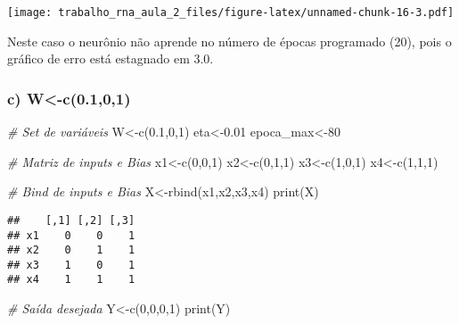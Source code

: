\documentclass[
]{article}
\newenvironment{Shaded}{\begin{snugshade}}{\end{snugshade}}
\newcommand{\CommentTok}[1]{\textcolor[rgb]{0.56,0.35,0.01}{\textit{#1}}}
\newcommand{\DecValTok}[1]{\textcolor[rgb]{0.00,0.00,0.81}{#1}}
\newcommand{\FloatTok}[1]{\textcolor[rgb]{0.00,0.00,0.81}{#1}}
\newcommand{\FunctionTok}[1]{\textcolor[rgb]{0.00,0.00,0.00}{#1}}
\newcommand{\NormalTok}[1]{#1}
\newcommand{\OtherTok}[1]{\textcolor[rgb]{0.56,0.35,0.01}{#1}}
\begin{document}
\texttt{[image: trabalho\_rna\_aula\_2\_files/figure-latex/unnamed-chunk-16-3.pdf]}

Neste caso o neurônio não aprende no número de épocas programado (20),
pois o gráfico de erro está estagnado em 3.0.

\hypertarget{c-w-c0.101}{%
\subsubsection{c) W\textless-c(0.1,0,1)}\label{c-w-c0.101}}

\begin{Shaded}
\begin{Highlighting}[]
\CommentTok{\# Set de variáveis}
\NormalTok{W}\OtherTok{\textless{}{-}}\FunctionTok{c}\NormalTok{(}\FloatTok{0.1}\NormalTok{,}\DecValTok{0}\NormalTok{,}\DecValTok{1}\NormalTok{)}
\NormalTok{eta}\OtherTok{\textless{}{-}}\FloatTok{0.01}
\NormalTok{epoca\_max}\OtherTok{\textless{}{-}}\DecValTok{80}

\CommentTok{\# Matriz de inputs e Bias}
\NormalTok{x1}\OtherTok{\textless{}{-}}\FunctionTok{c}\NormalTok{(}\DecValTok{0}\NormalTok{,}\DecValTok{0}\NormalTok{,}\DecValTok{1}\NormalTok{)}
\NormalTok{x2}\OtherTok{\textless{}{-}}\FunctionTok{c}\NormalTok{(}\DecValTok{0}\NormalTok{,}\DecValTok{1}\NormalTok{,}\DecValTok{1}\NormalTok{)}
\NormalTok{x3}\OtherTok{\textless{}{-}}\FunctionTok{c}\NormalTok{(}\DecValTok{1}\NormalTok{,}\DecValTok{0}\NormalTok{,}\DecValTok{1}\NormalTok{)}
\NormalTok{x4}\OtherTok{\textless{}{-}}\FunctionTok{c}\NormalTok{(}\DecValTok{1}\NormalTok{,}\DecValTok{1}\NormalTok{,}\DecValTok{1}\NormalTok{)}

\CommentTok{\# Bind de inputs e Bias}
\NormalTok{X}\OtherTok{\textless{}{-}}\FunctionTok{rbind}\NormalTok{(x1,x2,x3,x4)}
\FunctionTok{print}\NormalTok{(X)}
\end{Highlighting}
\end{Shaded}

\begin{verbatim}
##    [,1] [,2] [,3]
## x1    0    0    1
## x2    0    1    1
## x3    1    0    1
## x4    1    1    1
\end{verbatim}

\begin{Shaded}
\begin{Highlighting}[]
\CommentTok{\# Saída desejada}
\NormalTok{Y}\OtherTok{\textless{}{-}}\FunctionTok{c}\NormalTok{(}\DecValTok{0}\NormalTok{,}\DecValTok{0}\NormalTok{,}\DecValTok{0}\NormalTok{,}\DecValTok{1}\NormalTok{)}
\FunctionTok{print}\NormalTok{(Y)}
\end{Highlighting}
\end{Shaded}
\end{document}
